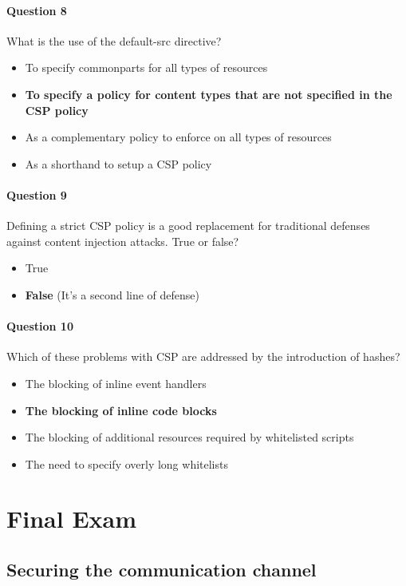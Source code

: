 \documentclass[titlepage]{article}
\begin{document}
    \paragraph{Question 8} What is the use of the default-src directive?
    \begin{itemize}
        \item To specify commonparts for all types of resources
        \item \textbf{To specify a policy for content types that are not specified in the CSP policy} \checkmark
        \item As a complementary policy to enforce on all types of resources
        \item As a shorthand to setup a CSP policy
    \end{itemize}
    \paragraph{Question 9} Defining a strict CSP policy is a good replacement for traditional defenses against content injection attacks. True or false?
    \begin{itemize}
        \item True
        \item \textbf{False} \checkmark (It's a second line of defense)
    \end{itemize}
    \paragraph{Question 10} Which of these problems with CSP are addressed by the introduction of hashes?
    \begin{itemize}
        \item The blocking of inline event handlers
        \item \textbf{The blocking of inline code blocks} \checkmark
        \item The blocking of additional resources required by whitelisted scripts
        \item The need to specify overly long whitelists
    \end{itemize}



    \newpage
    \section{Final Exam}
    \subsection{Securing the communication channel}
\end{document}
